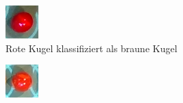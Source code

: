 \begin{figure}[h]
\begin{subfigure}[t]{0.2\textwidth}
                \includegraphics[width=1.0\linewidth]{../common/04_results/resources/classification/failed_classification_BROWN_RED_12_original.png}
                \caption{Rote Kugel klassifiziert als braune Kugel}
                \label{fig:classification_results_failed_classification_BROWN_RED_12_original}
        \end{subfigure}
        \hfill
        \begin{subfigure}[t]{0.2\textwidth}
                \raggedright
                \includegraphics[width=1.0\linewidth]{../common/04_results/resources/classification/failed_classification_RED_BROWN_3_original.png}

\end{subfigure}
\end{figure}
